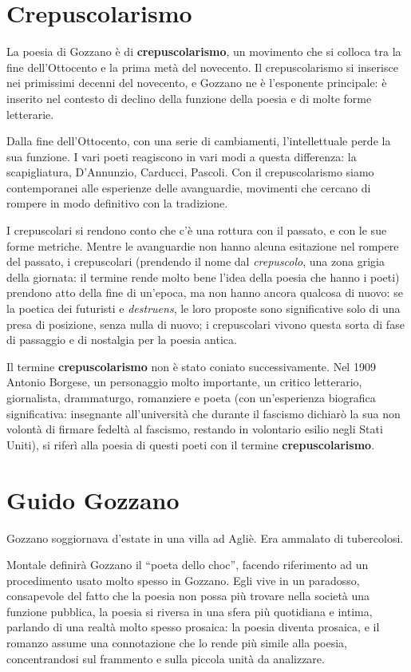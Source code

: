 \documentclass[a4paper, twoside, titlepage]{book}
\newcounter{mar}
\begin{document}
\chapter{Crepuscolarismo}

La poesia di Gozzano è di \textbf{crepuscolarismo}, un movimento che si colloca tra la fine dell’Ottocento e la prima metà del novecento.
Il crepuscolarismo si inserisce nei primissimi decenni del novecento, e Gozzano ne è l’esponente principale: è inserito nel contesto di declino della funzione della poesia e di molte forme letterarie.

Dalla fine dell’Ottocento, con una serie di cambiamenti, l’intellettuale perde la sua funzione. I vari poeti reagiscono in vari modi a questa differenza: la scapigliatura, D’Annunzio, Carducci, Pascoli.
Con il crepuscolarismo siamo contemporanei alle esperienze delle avanguardie, movimenti che cercano di rompere in modo definitivo con la tradizione.

I crepuscolari si rendono conto che c’è una rottura con il passato, e con le sue forme metriche. Mentre le avanguardie non hanno alcuna esitazione nel rompere del passato, i crepuscolari (prendendo il nome dal \textit{crepuscolo}, una zona grigia della giornata: il termine rende molto bene l’idea della poesia che hanno i poeti) prendono atto della fine di un’epoca, ma non hanno ancora qualcosa di nuovo: se la poetica dei futuristi e \textit{destruens}, le loro proposte sono significative solo di una presa di posizione, senza nulla di nuovo; i crepuscolari vivono questa sorta di fase di passaggio e di nostalgia per la poesia antica.

Il termine \textbf{crepuscolarismo} non è stato coniato successivamente. Nel 1909 Antonio Borgese, un personaggio molto importante, un critico letterario, giornalista, drammaturgo, romanziere e poeta (con un’esperienza biografica significativa: insegnante all’università che durante il fascismo dichiarò la sua non volontà di firmare fedeltà al fascismo, restando in volontario esilio negli Stati Uniti), si riferì alla poesia di questi poeti con il termine \textbf{crepuscolarismo}.

\chapter{Guido Gozzano}

Gozzano soggiornava d’estate in una villa ad Agliè. Era ammalato di tubercolosi.

Montale definirà Gozzano il “poeta dello choc”, facendo riferimento ad un procedimento usato molto spesso in Gozzano. 
Egli vive in un paradosso, consapevole del fatto che la poesia non possa più trovare nella società una funzione pubblica, la poesia si riversa in una sfera più quotidiana e intima, parlando di una realtà molto spesso prosaica: la poesia diventa prosaica, e il romanzo assume una connotazione che lo rende più simile alla poesia, concentrandosi sul frammento e sulla piccola unità da analizzare.
\end{document}
